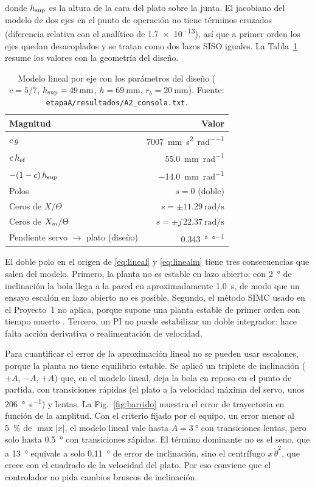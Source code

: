 donde $h_{\mathrm{sup}}$ es la altura de la cara del plato sobre la junta. El jacobiano del modelo de dos
ejes en el punto de operación no tiene términos cruzados (diferencia relativa con el analítico de
\num{1.7e-13}), así que a primer orden los ejes quedan desacoplados y se tratan como dos lazos
SISO iguales. La Tabla~\ref{tab:fisico} resume los valores con la geometría del diseño.

\begin{table}[!t]
\caption{Modelo lineal por eje con los parámetros del diseño ($c = 5/7$,
$h_{\mathrm{sup}} = \SI{49}{\milli\metre}$, $h = \SI{69}{\milli\metre}$, $r_b = \SI{20}{\milli\metre}$).
Fuente: \texttt{etapaA/resultados/A2\_consola.txt}.}
\label{tab:fisico}
\centering
\footnotesize
\begin{tabular}{@{}lr@{}}
\toprule
\textbf{Magnitud} & \textbf{Valor} \\
\midrule
$c\,g$ & \SI{7007}{\milli\metre\per\second\squared\per\radian} \\
$c\,h_{\mathrm{ef}}$ & \SI{55.0}{\milli\metre\per\radian} \\
$-(1-c)\,h_{\mathrm{sup}}$ & \SI{-14.0}{\milli\metre\per\radian} \\
Polos & $s = 0$ (doble) \\
Ceros de $X/\Theta$ & $s = \pm\SI{11.29}{\radian\per\second}$ \\
Ceros de $X_m/\Theta$ & $s = \pm j\,\SI{22.37}{\radian\per\second}$ \\
Pendiente servo $\rightarrow$ plato (diseño) & \SI{0.343}{\degree\per\degree} \\
\bottomrule
\end{tabular}
\end{table}

El doble polo en el origen de \eqref{eq:lineal} y \eqref{eq:linealm} tiene tres consecuencias que salen del modelo. Primero, la planta no
es estable en lazo abierto: con \SI{2}{\degree} de inclinación la bola llega a la pared en
aproximadamente \SI{1.0}{\second}, de modo que un ensayo escalón en lazo abierto no es posible.
Segundo, el método SIMC usado en el Proyecto~1 no aplica, porque supone una planta estable de
primer orden con tiempo muerto \cite{skogestad2003}. Tercero, un PI no puede estabilizar un doble
integrador: hace falta acción derivativa o realimentación de velocidad.

Para cuantificar el error de la aproximación lineal no se pueden usar escalones, porque la planta
no tiene equilibrio estable. Se aplicó un triplete de inclinación ($+A$, $-A$, $+A$) que, en el
modelo lineal, deja la bola en reposo en el punto de partida, con transiciones rápidas (el plato
a la velocidad máxima del servo, unos \SI{206}{\degree\per\second}) y lentas. La
Fig.~\ref{fig:barrido} muestra el error de trayectoria en función de la amplitud. Con el criterio
fijado por el equipo, un error menor al \SI{5}{\percent} de $\max|x|$, el modelo lineal vale
hasta $A = \SI{3}{\degree}$ con transiciones lentas, pero solo hasta \SI{0.5}{\degree} con
transiciones rápidas. El término dominante no es el seno, que a \SI{13}{\degree} equivale a solo
\SI{0.11}{\degree} de error de inclinación, sino el centrífugo $x\,\dot\theta^{2}$, que crece con
el cuadrado de la velocidad del plato. Por eso conviene que el controlador no pida cambios
bruscos de inclinación.

